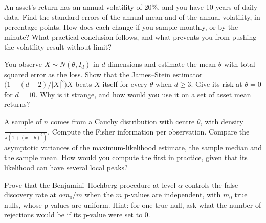 \begin{question}\label{iq:iv1:statistics:37}
An asset's return has an annual volatility of 20\%, and you have 10 years of daily data. Find the standard errors of the annual mean and of the annual volatility, in percentage points. How does each change if you sample monthly, or by the minute? What practical conclusion follows, and what prevents you from pushing the volatility result without limit?
\end{question}

\begin{question}\label{iq:iv1:statistics:38}
You observe $X \sim N(\theta, I_d)$ in $d$ dimensions and estimate the mean $\theta$ with total squared error as the loss. Show that the James--Stein estimator $\bigl(1 - (d - 2)/|X|^2\bigr)X$ beats $X$ itself for every $\theta$ when $d \ge 3$. Give its risk at $\theta = 0$ for $d = 10$. Why is it strange, and how would you use it on a set of asset mean returns?
\end{question}

\begin{question}\label{iq:iv1:statistics:39}
A sample of $n$ comes from a Cauchy distribution with centre $\theta$, with density $\frac{1}{\pi(1 + (x - \theta)^2)}$. Compute the Fisher information per observation. Compare the asymptotic variances of the maximum-likelihood estimate, the sample median and the sample mean. How would you compute the first in practice, given that its likelihood can have several local peaks?
\end{question}

\begin{question}\label{iq:iv1:statistics:40}
Prove that the Benjamini--Hochberg procedure at level $\alpha$ controls the false discovery rate at $\alpha m_0/m$ when the $m$ p-values are independent, with $m_0$ true nulls, whose p-values are uniform. Hint: for one true null, ask what the number of rejections would be if its p-value were set to 0.
\end{question}
